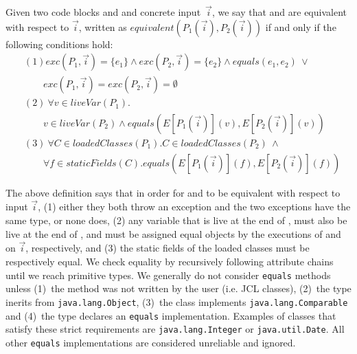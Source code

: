 \documentclass[sigconf,review,anonymous]{acmart}
\begin{document}
\begin{definition}\label{def:prog-equiv}
  Given two code blocks  and  and concrete input~$\vec{i}$,
  we say that  and  are equivalent
  with respect to $\vec{i}$, written as $equivalent(P_1(\vec{i}), P_2(\vec{i}))$
  if and only if the following conditions hold:
%
\[
\begin{aligned}
  & (1) exc(P_1, \vec{i})=\{e_1\} \wedge exc(P_2, \vec{i})=\{e_2\} \wedge equals(e_1,e_2) ~\vee\\
  & \qquad exc(P_1, \vec{i})=exc(P_2, \vec{i}) =\emptyset \\ 
      & (2)~ \forall v\in liveVar(P_1). \\
      & \qquad v\in liveVar(P_2) \wedge equals(E[P_1(\vec{i})](v), E[P_2(\vec{i})](v))\\
& (3)~  \forall C \in loadedClasses(P_1). C \in loadedClasses(P_2)~ \wedge \\
  &  \qquad \forall f {\in} staticFields(C).equals(E[P_1(\vec{i})](f), E[P_2(\vec{i})](f))
    \end{aligned}
    \]
   
  \end{definition}

The above definition says that in order for  and
 to be equivalent with respect to input $\vec{i}$,
(1) either they both throw an exception and the two exceptions have the same type, or none does,
(2) any variable
that is live at the end of , must also be live at the end of , and  must be
assigned equal objects by the executions of  and
 on $\vec{i}$, respectively, and
(3) the static fields of the loaded classes must be respectively equal.  We
check equality by recursively following attribute chains until we reach
primitive types.  We generally do not consider \texttt{equals} methods
unless (1)~the method was not written by the user (i.e.  JCL classes),
(2)~the type inerits from \texttt{java.lang.Object}, (3)~the class
implements \texttt{java.lang.Comparable} and (4)~the type declares an
\texttt{equals} implementation.  Examples of classes that satisfy these
strict requirements are \texttt{java.lang.Integer} or
\texttt{java.util.Date}.  All other \texttt{equals} implementations are
considered unreliable and ignored.
\end{document}
